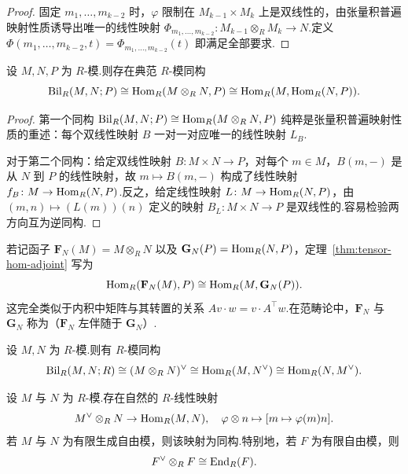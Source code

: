 \begin{proof}
固定 $m_1, \dots, m_{k-2}$ 时，$\varphi$ 限制在 $M_{k-1} \times M_k$ 上是双线性的，由张量积普遍映射性质诱导出唯一的线性映射 $\Phi_{m_1, \dots, m_{k-2}} \colon M_{k-1} \otimes_R M_k \to N$.定义 $\Phi(m_1, \dots, m_{k-2}, t) = \Phi_{m_1, \dots, m_{k-2}}(t)$ 即满足全部要求.
\end{proof}

\begin{theorem}\label{thm:tensor-hom-adjoint}
设 $M, N, P$ 为 $R$-模.则存在典范 $R$-模同构
\[
  \operatorname{Bil}_R(M, N; P) \cong \operatorname{Hom}_R(M \otimes_R N, P) \cong \operatorname{Hom}_R(M, \operatorname{Hom}_R(N, P)).
\]
\end{theorem}

\begin{proof}
第一个同构 $\operatorname{Bil}_R(M, N; P) \cong \operatorname{Hom}_R(M \otimes_R N, P)$ 纯粹是张量积普遍映射性质的重述：每个双线性映射 $B$ 一对一对应唯一的线性映射 $L_B$.

对于第二个同构：给定双线性映射 $B \colon M \times N \to P$，对每个 $m \in M$，$B(m, -)$ 是从 $N$ 到 $P$ 的线性映射，故 $m \mapsto B(m, -)$ 构成了线性映射 $f_B \colon M \to \operatorname{Hom}_R(N, P)$.反之，给定线性映射 $L \colon M \to \operatorname{Hom}_R(N, P)$，由 $(m, n) \mapsto (L(m))(n)$ 定义的映射 $B_L \colon M \times N \to P$ 是双线性的.容易检验两方向互为逆同构.
\end{proof}

若记函子 $\mathbf{F}_N(M) = M \otimes_R N$ 以及 $\mathbf{G}_N(P) = \operatorname{Hom}_R(N, P)$，定理~\ref{thm:tensor-hom-adjoint} 写为
\[
  \operatorname{Hom}_R(\mathbf{F}_N(M), P) \cong \operatorname{Hom}_R(M, \mathbf{G}_N(P)).
\]
这完全类似于内积中矩阵与其转置的关系 $Av \cdot w = v \cdot A^\top w$.在范畴论中，$\mathbf{F}_N$ 与 $\mathbf{G}_N$ 称为（$\mathbf{F}_N$ 左伴随于 $\mathbf{G}_N$）.

\begin{corollary}\label{cor:dual-tensor}
设 $M, N$ 为 $R$-模.则有 $R$-模同构
\[
  \operatorname{Bil}_R(M, N; R) \cong (M \otimes_R N)^\vee \cong \operatorname{Hom}_R(M, N^\vee) \cong \operatorname{Hom}_R(N, M^\vee).
\]
\end{corollary}

\begin{theorem}\label{thm:dual-tensor-hom}
设 $M$ 与 $N$ 为 $R$-模.存在自然的 $R$-线性映射
\[
  M^\vee \otimes_R N \to \operatorname{Hom}_R(M, N), \quad \varphi \otimes n \mapsto [m \mapsto \varphi(m)n].
\]
若 $M$ 与 $N$ 为有限生成自由模，则该映射为同构.特别地，若 $F$ 为有限自由模，则
\[
  F^\vee \otimes_R F \cong \operatorname{End}_R(F).
\]
\end{theorem}


